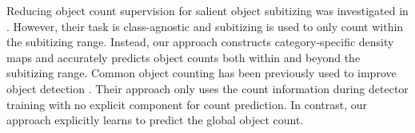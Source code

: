 \documentclass[10pt,twocolumn,letterpaper]{article}
\begin{document}
   Reducing object count supervision for salient object subitizing was investigated in \cite{sos_subitizing_cvpr2015}. 
However, their task is class-agnostic and subitizing is used to only count within the subitizing range. Instead, our approach constructs category-specific density maps and accurately predicts object counts both within and beyond the subitizing range. Common object counting has been previously used to improve object detection \cite{Chattopadhyay_2017_CVPR,Gao_2018_ECCV}. Their approach only uses the count information during detector training with no explicit component for count prediction. In contrast, our approach explicitly learns to predict the global object count. 



























































\vspace{-0.2cm}
\end{document}
